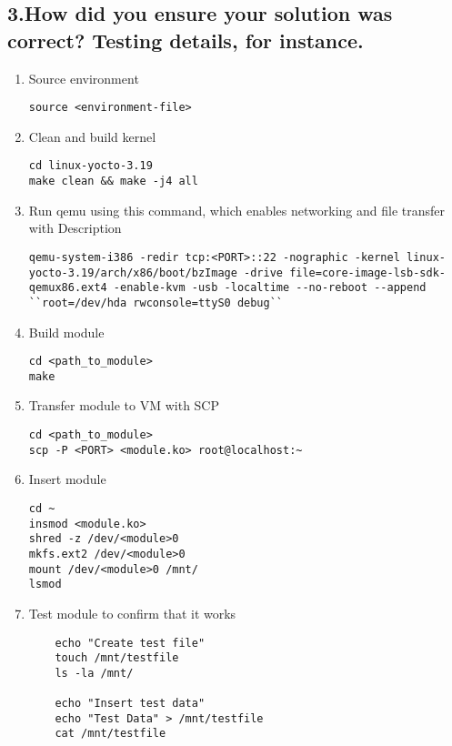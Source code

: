 \documentclass[onecolumn, draftclsnofoot,10pt, compsoc]{IEEEtran}
\begin{document}
	\subsection*{3.How did you ensure your solution was correct? Testing details, for instance.}
	\begin{enumerate}

	\item Source environment
	\begin{lstlisting}
source <environment-file>
\end{lstlisting}

	\item Clean and build kernel
	\begin{lstlisting}
cd linux-yocto-3.19
make clean && make -j4 all
\end{lstlisting}

	\item Run qemu using this command, which enables networking and file transfer with Description
	\begin{lstlisting}
qemu-system-i386 -redir tcp:<PORT>::22 -nographic -kernel linux-yocto-3.19/arch/x86/boot/bzImage -drive file=core-image-lsb-sdk-qemux86.ext4 -enable-kvm -usb -localtime --no-reboot --append ``root=/dev/hda rwconsole=ttyS0 debug``
\end{lstlisting}

\item Build module
\begin{lstlisting}
cd <path_to_module>
make
\end{lstlisting}

	\item Transfer module to VM with SCP
	\begin{lstlisting}
cd <path_to_module>
scp -P <PORT> <module.ko> root@localhost:~
\end{lstlisting}

	\item Insert module
	\begin{lstlisting}
cd ~
insmod <module.ko>
shred -z /dev/<module>0
mkfs.ext2 /dev/<module>0
mount /dev/<module>0 /mnt/
lsmod
\end{lstlisting}

	\item Test module to confirm that it works
	\begin{lstlisting}
	echo "Create test file"
	touch /mnt/testfile
	ls -la /mnt/

	echo "Insert test data"
	echo "Test Data" > /mnt/testfile
	cat /mnt/testfile


\end{lstlisting}
\end{enumerate}
\end{document}
